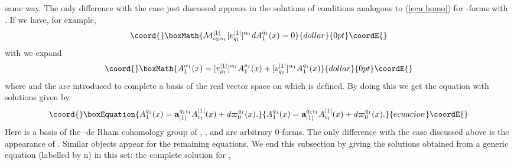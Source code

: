 \documentclass[prd,a4paper,twocolumn,amssymb,amsmath,nofootinbib,showpacs]{revtex4}
\begin{document}
same way. The only difference with the case just discussed appears
in the solutions of conditions analogous to (\ref{ecu homo}) for
\coordHE{}-forms with \coordHE{}. If we have, for example,
$$\coord{}\boxMath{
\mathcal{M}_{c_2\alpha_1}^{|1|}[v^{|1|}_{q_1}]^{\alpha_1}
dA_1^{q_1}(x)=0
}{dollar}{0pt}\coordE{}$$
with \coordHE{}
we expand
$$\coord{}\boxMath{
A_1^{\alpha_1}(x)=[r^{|1|}_{p_1}]^{\alpha_1}A_1^{p_1}(x)+
[v^{|1|}_{q_1}]^{\alpha_1} A_1^{q_1}(x)
}{dollar}{0pt}\coordE{}$$
where
\coordHE{} and
the \coordHE{} are introduced to complete a
basis of the real vector space on which
\coordHE{} is defined. By doing this we get
the equation \coordHE{} with solutions given by
\begin{equation}\coord{}\boxEquation{
A_1^{q_1}(x)=\mathbf{a}_{|1|}^{q_1i_1}A_{i_1}^{|1|}(x)+d\varpi_0^{q_1}(x).
\label{solA1q}
}{
A_1^{q_1}(x)=\mathbf{a}_{|1|}^{q_1i_1}A_{i_1}^{|1|}(x)+d\varpi_0^{q_1}(x).
}{ecuacion}\coordE{}\end{equation}
Here  \coordHE{} is a
basis of the \coordHE{}-de Rham cohomology group of
\coordHE{}, \coordHE{}, and
\coordHE{} are arbitrary 0-forms. The only difference
with the case discussed above is the appearance of
\coordHE{}. Similar objects appear for the remaining
equations. We end this subsection by giving the solutions obtained
from a generic equation (labelled by n) in this set: the complete
solution for \coordHE{}, \coordHE{}
\end{document}
